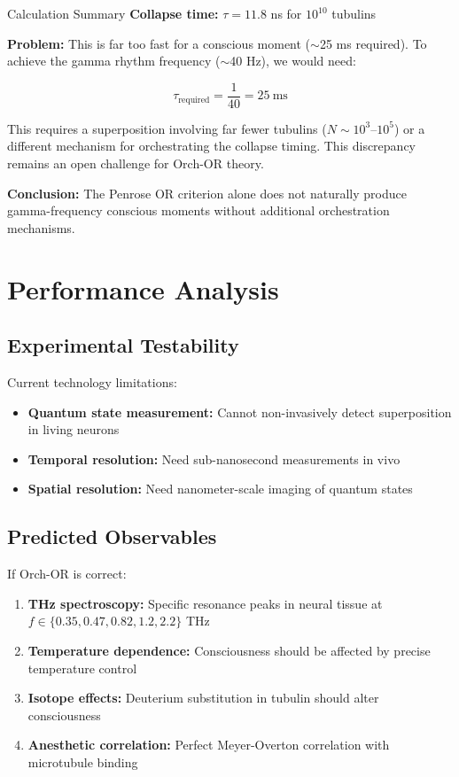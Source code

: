\begin{calloutbox}[colback=black!8!white,colframe=black]{Calculation Summary}
\textbf{Collapse time:} $\tau = 11.8$ ns for $10^{10}$ tubulins

\textbf{Problem:} This is far too fast for a conscious moment ($\sim$25 ms required). To achieve the gamma rhythm frequency ($\sim$40 Hz), we would need:

\begin{equation}
\tau_{\text{required}} = \frac{1}{40} = 25~\text{ms}
\end{equation}

This requires a superposition involving far fewer tubulins ($N \sim 10^3$--$10^5$) or a different mechanism for orchestrating the collapse timing. This discrepancy remains an open challenge for Orch-OR theory.

\textbf{Conclusion:} The Penrose OR criterion alone does not naturally produce gamma-frequency conscious moments without additional orchestration mechanisms.
\end{calloutbox}

\section{Performance Analysis}

\subsection{Experimental Testability}

Current technology limitations:
\begin{itemize}
\item \textbf{Quantum state measurement:} Cannot non-invasively detect superposition in living neurons
\item \textbf{Temporal resolution:} Need sub-nanosecond measurements in vivo
\item \textbf{Spatial resolution:} Need nanometer-scale imaging of quantum states
\end{itemize}

\subsection{Predicted Observables}

If Orch-OR is correct:
\begin{enumerate}
\item \textbf{THz spectroscopy:} Specific resonance peaks in neural tissue at $f \in \{0.35, 0.47, 0.82, 1.2, 2.2\}$ THz
\item \textbf{Temperature dependence:} Consciousness should be affected by precise temperature control
\item \textbf{Isotope effects:} Deuterium substitution in tubulin should alter consciousness
\item \textbf{Anesthetic correlation:} Perfect Meyer-Overton correlation with microtubule binding
\end{enumerate}


